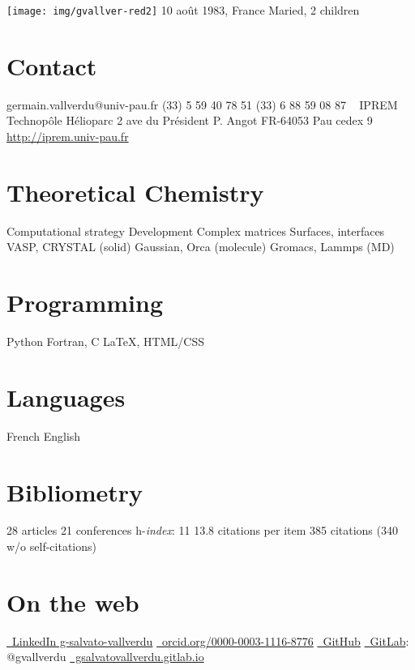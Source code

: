 \documentclass{cv-style}     %
\begin{document}


\begin{aside}
    \texttt{[image: img/gvallver-red2]}
    10 août 1983, France
    Maried, 2 children
    \section{Contact}
    germain.vallverdu@univ-pau.fr
    (33) 5 59 40 78 51
    (33) 6 88 59 08 87
    ~
    {\color{gray} \faFlask} IPREM
    Technopôle Hélioparc
    2 ave du Président P. Angot
    FR-64053 Pau cedex 9
    \href{http://iprem.univ-pau.fr/fr/index.html}{http://iprem.univ-pau.fr}
    \section{Theoretical Chemistry}
    Computational strategy
    Development
    Complex matrices
    Surfaces, interfaces
    VASP, CRYSTAL (solid)
    Gaussian, Orca (molecule)
    Gromacs, Lammps (MD)
    \section{Programming}
    {\color{gray}\faPython} Python
    Fortran, C
    \LaTeX{}, HTML/CSS
    \section{Languages}
    French
    English 
    \section{Bibliometry}
    28 articles
    21 conferences
    h-\textit{index}: 11
    13.8 citations per item
    385 citations (340 w/o self-citations)
    \section{On the web}
    \href{https://www.linkedin.com/in/g-salvato-vallverdu/}{\color{gray}\faLinkedin\small ~LinkedIn g-salvato-vallverdu}
    \href{http://orcid.org/0000-0003-1116-8776}{\color{gray}\faOrcid\footnotesize ~orcid.org/0000-0003-1116-8776}
    \href{https://github.com/gVallverdu}{\color{gray}\faGithub\small ~GitHub} \href{https://gitlab.com/gvallverdu}{\color{gray}\faGitlab\small ~GitLab}: {\small @gvallverdu} 
    \href{https://gsalvatovallverdu.gitlab.io/}{\color{gray}\faFile*[regular]\small ~gsalvatovallverdu.gitlab.io}
\end{aside}
\end{document}
